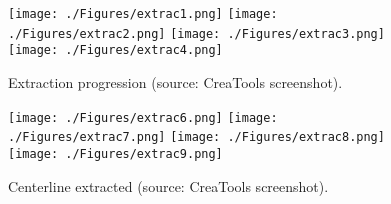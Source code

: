 \begin{figure}[ht]
	\centering
		\texttt{[image: ./Figures/extrac1.png]}
		\texttt{[image: ./Figures/extrac2.png]}
		\texttt{[image: ./Figures/extrac3.png]}
		\texttt{[image: ./Figures/extrac4.png]}
	\caption[Centerline Extraction GUI 1]{Extraction progression (source: CreaTools screenshot).}
	\label{fig:apa_cent1}
\end{figure}

\begin{figure}[ht]
	\centering
		\texttt{[image: ./Figures/extrac6.png]}
		\texttt{[image: ./Figures/extrac7.png]}
		\texttt{[image: ./Figures/extrac8.png]}
		\texttt{[image: ./Figures/extrac9.png]}
	\caption[Centerline Extraction GUI 2]{Centerline extracted (source: CreaTools screenshot).}
	\label{fig:apa_cent1}
\end{figure}


